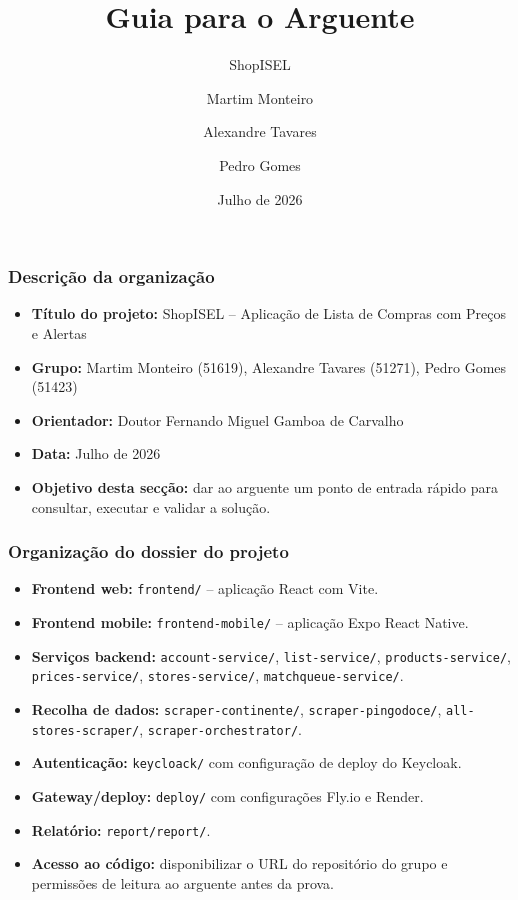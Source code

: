 \documentclass[aspectratio=169]{beamer}
\title{Guia para o Arguente}
\subtitle{ShopISEL}
\author{Martim Monteiro \and Alexandre Tavares \and Pedro Gomes}
\date{Julho de 2026}
\begin{document}
\begin{frame}
  \frametitle{Descri\c{c}\~ao da organiza\c{c}\~ao}
  \begin{itemize}[leftmargin=1.6em]
    \item \textbf{T\'itulo do projeto:} ShopISEL -- Aplica\c{c}\~ao de Lista de Compras com Pre\c{c}os e Alertas
    \item \textbf{Grupo:} Martim Monteiro (51619), Alexandre Tavares (51271), Pedro Gomes (51423)
    \item \textbf{Orientador:} Doutor Fernando Miguel Gamboa de Carvalho
    \item \textbf{Data:} Julho de 2026
    \item \textbf{Objetivo desta sec\c{c}\~ao:} dar ao arguente um ponto de entrada r\'apido para consultar, executar e validar a solu\c{c}\~ao.
  \end{itemize}
\end{frame}

\begin{frame}
  \frametitle{Organiza\c{c}\~ao do dossier do projeto}
  \small
  \begin{itemize}[leftmargin=1.6em]
    \item \textbf{Frontend web:} \texttt{frontend/} -- aplica\c{c}\~ao React com Vite.
    \item \textbf{Frontend mobile:} \texttt{frontend-mobile/} -- aplica\c{c}\~ao Expo React Native.
    \item \textbf{Servi\c{c}os backend:} \texttt{account-service/}, \texttt{list-service/}, \texttt{products-service/}, \texttt{prices-service/}, \texttt{stores-service/}, \texttt{matchqueue-service/}.
    \item \textbf{Recolha de dados:} \texttt{scraper-continente/}, \texttt{scraper-pingodoce/}, \texttt{all-stores-scraper/}, \texttt{scraper-orchestrator/}.
    \item \textbf{Autentica\c{c}\~ao:} \texttt{keycloack/} com configura\c{c}\~ao de deploy do Keycloak.
    \item \textbf{Gateway/deploy:} \texttt{deploy/} com configura\c{c}\~oes Fly.io e Render.
    \item \textbf{Relat\'orio:} \texttt{report/report/}.
    \item \textbf{Acesso ao c\'odigo:} disponibilizar o URL do reposit\'orio do grupo e permiss\~oes de leitura ao arguente antes da prova.
  \end{itemize}
\end{frame}
\end{document}
